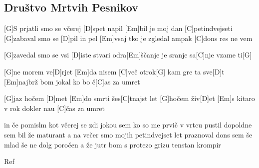 \documentclass{article}
\begin{document}
\subsection*{Društvo Mrtvih Pesnikov}
\begin{guitar}

	[G]S prjatli smo se včerej [D]spet napil
	[Em]bil je moj dan [C]petindvejseti
	[G]zabaval smo se [D]pil in pel
	[Em]vsaj tko je zgledal ampak [C]dons res ne vem
	\linebreak

	[G]zavedal smo se vsi [D]iste stvari
	odra[Em]ščanje je sranje sa[C]nje vzame ti[G]
	\linebreak

	[G]ne morem ve[D]rjet
	[Em]da nisem [C]več otrok[G]
	kam gre ta sve[D]t
	[Em]najbrž bom jokal ko bo č[C]as za umret
	\linebreak

	[G]jaz hočem [D]met
	[Em]do smrti šes[C]tnajst let
	[G]hočem živ[D]et
	[Em]s kitaro v rok dokler nau [C]čas za umret
	\linebreak

	in če pomislm kot včerej se zdi
	jokou sem ko so me prvič v vrtcu pustil
	dopoldne sem bil že maturant
	a na večer smo mojih petindvejset let praznoval
	dons sem še mlad še ne dolg poročen
	a že jutr bom s protezo grizu tenstan krompir
	\linebreak
		
	Ref

\end{guitar}
\end{document}
